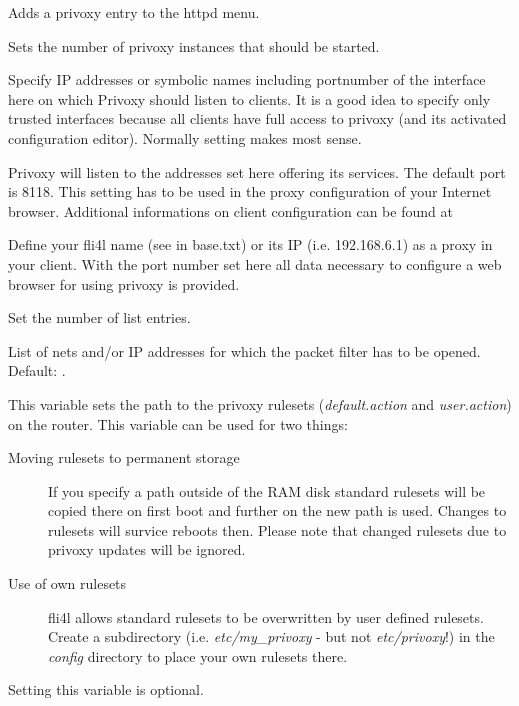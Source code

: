 \begin{description}


Adds a privoxy entry to the httpd menu.


        Sets the number of privoxy instances that should be started.


        {Specify IP addresses or symbolic names including portnumber of
        the interface here on which Privoxy should listen to clients.
        It is a good idea to specify only trusted interfaces because
        all clients have full access to privoxy (and its activated
        configuration editor). Normally setting 
        makes most sense.

        Privoxy will listen to the addresses set here offering its
        services. The default port is 8118. This setting has to be used
        in the proxy configuration of your Internet browser. Additional
        informations on client configuration can be found at

        Define your fli4l name (see  in base.txt) or its
        IP (i.e. 192.168.6.1) as a proxy in your client. With the port
        number set here all data necessary to configure a web browser
        for using privoxy is provided.}


        {Set the number of list entries.}


        List of nets and/or IP addresses for which the packet filter
        has to be opened. Default: .

 {
  This variable sets the path to the privoxy rulesets (\emph{default.action}
  and \emph{user.action}) on the router.
  This variable can be used for two things:
  \begin{description}
  \item [Moving rulesets to permanent storage]
    If you specify a path outside of the RAM disk standard rulesets will be
    copied there on first boot and further on the new path is used. Changes to
    rulesets will survice reboots then. Please note that changed rulesets due
    to privoxy updates will be ignored.
  \item [Use of own rulesets]
    fli4l allows standard rulesets  to be overwritten by user defined rulesets.
    Create a subdirectory (i.e. \emph{etc/my\_privoxy} - but not \emph{etc/privoxy}!)
    in the \emph{config} directory to place your own rulesets there.
\end{description}
  Setting this variable is optional.
}


\end{description}
